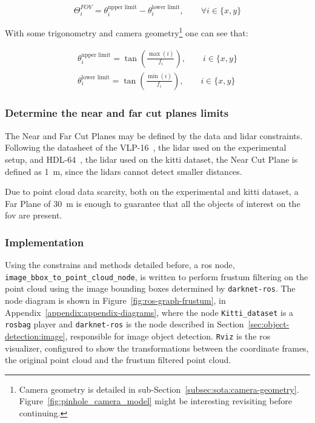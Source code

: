 \begin{equation}
	\label{eq:image-fov}
	\Theta^{FOV}_i = \theta^\text{upper limit}_i - \theta^\text{lower limit}_i, \qquad \forall i \in \{x, y\}
\end{equation}

With some trigonometry and camera geometry\footnote{Camera geometry is detailed in sub-Section~\ref{subsec:sota:camera-geometry}. Figure~\ref{fig:pinhole_camera_model} might be interesting revisiting before continuing.} one can see that:

\begin{align}
	\theta^\text{upper limit}_i = \tan\left(\frac{\max(i)}{f_i}\right), \qquad i \in \{x, y\} \\
	\theta^\text{lower limit}_i = \tan\left(\frac{\min(i)}{f_i}\right), \qquad i \in \{x, y\} 
\end{align}

\subsubsection{Determine the near and far cut planes limits}
The Near and Far Cut Planes may be defined by the data and \ac{lidar} constraints. Following the datasheet of the VLP-16~\cite{vlp16}, the \ac{lidar} used on the experimental setup, and HDL-64~\cite{VelodyneHDL64}, the \ac{lidar} used on the \ac{kitti} dataset, the Near Cut Plane is defined as \SI{1}{\meter}, since the \acp{lidar} cannot detect smaller distances.

Due to point cloud data scarcity, both on the experimental and  \ac{kitti} dataset, a Far Plane of \SI{30}{\meter} is enough to guarantee that all the objects of interest on the \ac{fov} are present.

\subsubsection{Implementation}
Using the constrains and methods detailed before, a \ac{ros} node, \texttt{image\_bbox\_to\_point\_cloud\_node}, is written to perform frustum filtering on the point cloud using the image bounding boxes determined by \texttt{darknet-ros}. The node diagram is shown in Figure~\ref{fig:ros-graph-frustum}, in Appendix~\ref{appendix:appendix-diagrams}, where the node \texttt{Kitti\_dataset} is a \texttt{rosbag} player and \texttt{darknet-ros} is the node described in Section~\ref{sec:object-detection:image}, responsible for image object detection. \texttt{Rviz} is the \ac{ros} visualizer, configured to show the transformations between the coordinate frames, the original point cloud and the frustum filtered point cloud.

